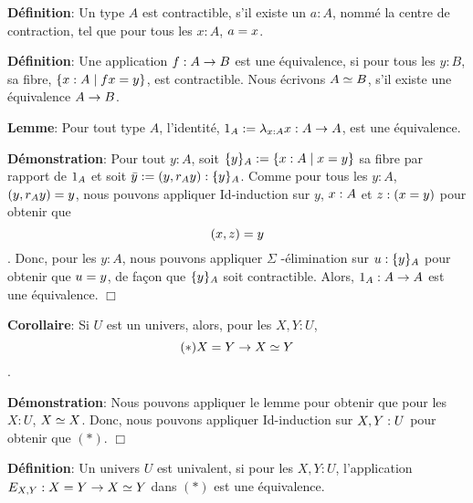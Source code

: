\documentclass{article}
\begin{document}
 
 
 \textbf{Définition}:
 Un type $A$ est contractible, s'il existe un $a : A$, nommé la centre de contraction, tel que pour tous les $x : A$, $a = x$.
 
 \textbf{Définition}:
 Une application $f : A \rightarrow B$ est une équivalence, si pour tous les $y : B$, sa fibre, $\{ x : A \mid f x = y \}$, est contractible.
 Nous écrivons $A \simeq B$, s'il existe une équivalence $A \rightarrow B$.
 
 \textbf{Lemme}:
 Pour tout type $A$, l'identité, $1_{ A } := \lambda_{x : A} x : A \rightarrow A$, est une équivalence.
 
 \textbf{Démonstration}:
 Pour tout $y : A$, soit $\{ y \}_{ A } := \{ x : A \mid x = y \}$ sa fibre par rapport de $1_{ A }$ et soit $\bar{ y } := ( y , r_{ A } y ) : \{ y \}_{ A }$.
 Comme pour tous les $y : A$, $( y , r_{ A } y ) = y$, nous pouvons appliquer Id-induction sur $y$, $x : A$ et $z : ( x = y )$ pour obtenir que \[( x , z ) = y\].
 Donc, pour les $y : A$, nous pouvons appliquer $\Sigma$ -élimination sur $u : \{ y \}_{ A }$ pour obtenir que $u = y$, de façon que $\{ y \}_{ A }$ soit contractible.
 Alors, $1_{ A } : A \rightarrow A$ est une équivalence.
  $\Box$ 
 
 \textbf{Corollaire}:
 Si $U$ est un univers, alors, pour les $X , Y : U$, \[(*)X = Y \rightarrow X \simeq Y\].
 
 \textbf{Démonstration}:
 Nous pouvons appliquer le lemme pour obtenir que pour les $X : U$, $X \simeq X$.
 Donc, nous pouvons appliquer Id-induction sur $X , Y : U$ pour obtenir que $(*)$.
  $\Box$ 
 
 
 \textbf{Définition}:
 Un univers $U$ est univalent, si pour les $X , Y : U$, l'application $E_ { X , Y }: X = Y \rightarrow X \simeq Y$ dans $(*)$ est une équivalence.
 
 
\end{document}
